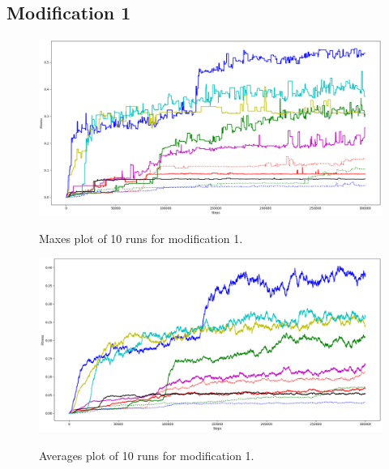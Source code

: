 \documentclass[a4]{article}
\begin{document}
\subsection{Modification 1}
\begin{figure}[H]
	\includegraphics[scale=0.31]{mod1}
	\label{fig:m1}
	\caption{Maxes plot of 10 runs for modification 1.}
\end{figure}
\begin{figure}[H]
	\includegraphics[scale=0.31]{avmod1}
	\label{fig:m1av}
	\caption{Averages plot of 10 runs for modification 1.}
\end{figure}
\end{document}
